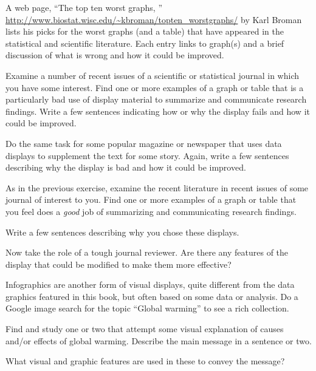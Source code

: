 
\begin{Exercises}

 \exercise A web page, ``The top ten worst graphs, '' \url{http://www.biostat.wisc.edu/~kbroman/topten_worstgraphs/} by Karl Broman lists his picks for the worst graphs (and a table) that have appeared in the
 statistical and scientific literature.  Each entry links to graph(s) and a brief discussion of
 what is wrong and how it could be improved. 
 \begin{enumerate*}
   \item Examine a number of recent issues of a scientific or statistical journal in which you
   have some interest.  Find one or more examples of a graph or table that is a particularly
   bad use of display material to summarize and communicate research findings. Write a
   few sentences indicating how or why the display fails and how it could be improved.
   \item Do the same task for some popular magazine or newspaper that uses data displays
   to supplement the text for some story. Again, write a few sentences describing why the
   display is bad and how it could be improved.
 \end{enumerate*}
 
 \exercise As in the previous exercise, examine the recent literature in recent issues of some
 journal of interest to you.  Find one or more examples of a graph or table that you feel
 does a \emph{good} job of summarizing and communicating research findings.
 \begin{enumerate*}
   \item Write a few sentences describing why you chose these displays.
   \item Now take the role of a tough journal reviewer.  Are there any features of the
   display that could be modified to make them more effective?
 \end{enumerate*}
 
 \exercise Infographics are another form of visual displays, quite different from the
 data graphics featured in this book, but often based on some data or analysis.
 Do a Google image search for the topic ``Global warming'' to see a rich
 collection.
 \begin{enumerate*}
   \item Find and study one or two that attempt some visual explanation of causes
   and/or effects of global warming.  Describe the main message in a sentence or
   two.
   \item What visual and graphic features are used in these to convey the message?
 \end{enumerate*}


\end{Exercises}
